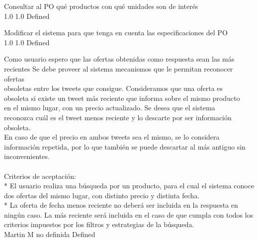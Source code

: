 		{Consultar al PO qué productos con qué unidades son de interés} %
		{\\
} %
		{1.0} %
		{} %
		{1.0} %
		{Defined} %

		{Modificar el sistema para que tenga en cuenta las especificaciones del PO} %
		{\\
} %
		{1.0} %
		{} %
		{1.0} %
		{Defined} %


\vspace{20pt}

	{Como usuario espero que las ofertas obtenidas como respuesta sean las más recientes} %
	{Se debe proveer al sistema mecanismos que le permitan reconocer ofertas\\
obsoletas entre los tweets que consigue. Consideramos que una oferta es\\
obsoleta si existe un tweet más reciente que informa sobre el mismo producto\\
en el mismo lugar, con un precio actualizado. Se desea que el sistema\\
reconozca cuál es el tweet menos reciente y lo descarte por ser información\\
obsoleta.\\
En caso de que el precio en ambos tweets sea el mismo, se lo considera\\
información repetida, por lo que también se puede descartar al más antiguo sin\\
inconvenientes.\\
  \\
Criterios de aceptación:\\
* El usuario realiza una búsqueda por un producto, para el cual el sistema conoce dos ofertas del mismo lugar, con distinto precio y distinta fecha.  \\
* La oferta de fecha menos reciente no deberá ser incluida en la respuesta en ningún caso. La más reciente será incluida en el caso de que cumpla con todos los criterios impuestos por los filtros y estrategias de la búsqueda.\\
} %
	{} %
	{} %
	{Martin M} %
	{no definida} %
	{Defined} %


